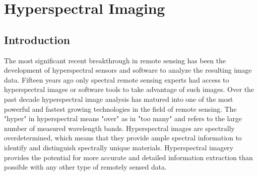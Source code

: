 \documentclass[document.tex]{subfiles}
\begin{document}
\chapter{Hyperspectral Imaging}
\section{Introduction}
The most significant recent breakthrough in remote sensing has been the development of
hyperspectral sensors and software to analyze the resulting image data\cite{3}. Fifteen years ago only spectral remote sensing experts had access to hyperspectral images or software tools to take advantage of such images. Over the past decade hyperspectral image analysis
has matured into one of the most powerful and fastest growing technologies in the field
of remote sensing. The "hyper" in hyperspectral means "over" as in "too many" and
refers to the large number of measured wavelength bands. Hyperspectral images are
spectrally overdetermined, which means that they provide ample spectral information to
identify and distinguish spectrally unique materials. Hyperspectral imagery provides the
potential for more accurate and detailed information extraction than possible with any
other type of remotely sensed data.
\end{document}
